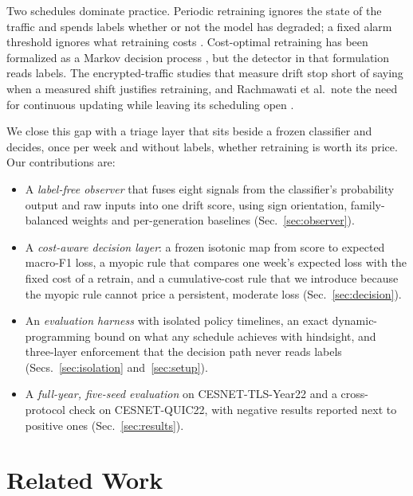 \documentclass[conference]{IEEEtran}
\begin{document}
Two schedules dominate practice. Periodic retraining ignores the state of the traffic and spends labels whether or not the model has degraded; a fixed alarm threshold ignores what retraining costs \cite{gudepu2023}. Cost-optimal retraining has been formalized as a Markov decision process \cite{kanda2023}, but the detector in that formulation reads labels. The encrypted-traffic studies that measure drift \cite{kurapov2024,jancicka2024,malekghaini2023} stop short of saying when a measured shift justifies retraining, and Rachmawati et al.\ note the need for continuous updating while leaving its scheduling open \cite{rachmawati2021}.

We close this gap with a triage layer that sits beside a frozen classifier and decides, once per week and without labels, whether retraining is worth its price. Our contributions are:
\begin{itemize}
\item A \emph{label-free observer} that fuses eight signals from the classifier's probability output and raw inputs into one drift score, using sign orientation, family-balanced weights and per-generation baselines (Sec.~\ref{sec:observer}).
\item A \emph{cost-aware decision layer}: a frozen isotonic map from score to expected macro-F1 loss, a myopic rule that compares one week's expected loss with the fixed cost of a retrain, and a cumulative-cost rule that we introduce because the myopic rule cannot price a persistent, moderate loss (Sec.~\ref{sec:decision}).
\item An \emph{evaluation harness} with isolated policy timelines, an exact dynamic-programming bound on what any schedule achieves with hindsight, and three-layer enforcement that the decision path never reads labels (Secs.~\ref{sec:isolation} and~\ref{sec:setup}).
\item A \emph{full-year, five-seed evaluation} on CESNET-TLS-Year22 and a cross-protocol check on CESNET-QUIC22, with negative results reported next to positive ones (Sec.~\ref{sec:results}).
\end{itemize}

\section{Related Work}
\end{document}
